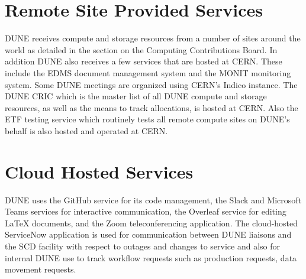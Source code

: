 \documentclass[../main-v1.tex]{subfiles}
\begin{document}
\section{Remote Site Provided Services}
DUNE receives compute and storage resources from a number of sites around the world as detailed in the section on the Computing Contributions Board. In addition DUNE also receives a few services that are hosted at CERN.  These include the EDMS document
management system and  the MONIT monitoring system. Some DUNE meetings are organized using CERN's Indico instance.  The DUNE CRIC which is the master list of all DUNE compute and storage resources, as well as the means to track allocations, is hosted at CERN.  Also the ETF testing service which routinely tests all remote compute sites on DUNE's behalf is also hosted and operated at CERN.


\section{Cloud Hosted Services}
DUNE uses the GitHub service for its code management, the Slack and Microsoft Teams services for interactive communication, the Overleaf service for editing \LaTeX{} documents, and the Zoom teleconferencing application.  The cloud-hosted ServiceNow application is used for communication between DUNE liaisons and the SCD facility with respect to outages and changes to service and also for internal DUNE use to track workflow requests such as production requests, data movement requests.
\end{document}
